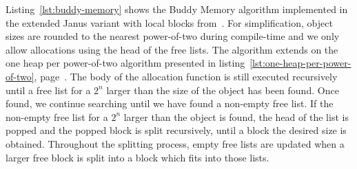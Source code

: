 Listing~\ref{lst:buddy-memory} shows the Buddy Memory algorithm implemented in the extended Janus variant with local blocks from~\cite{ty:ejanus}. For simplification, object sizes are rounded to the nearest power-of-two during compile-time and we only allow allocations using the head of the free lists. The algorithm extends on the one heap per power-of-two algorithm presented in listing~\ref{lst:one-heap-per-power-of-two}, page~\pageref{lst:one-heap-per-power-of-two}.
The body of the allocation function is still executed recursively until a free list for a $2^n$ larger than the size of the object has been found. Once found, we continue searching until we have found a non-empty free list. If the non-empty free list for a $2^n$ larger than the object is found, the head of the list is popped and the popped block is split recursively, until a block the desired size is obtained. Throughout the splitting process, empty free lists are updated when a larger free block is split into a block which fits into those lists.
